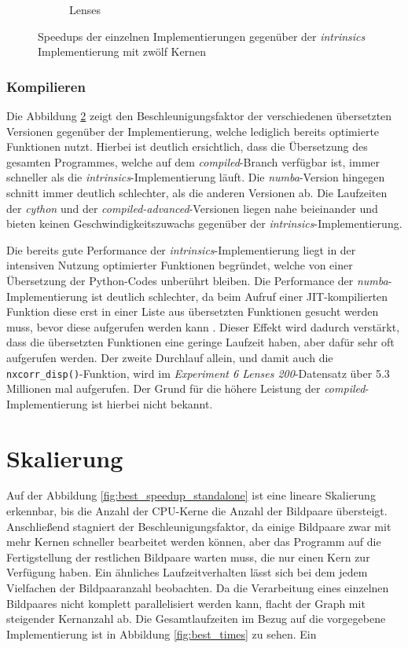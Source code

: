 \begin{center}
\begin{figure}[htbp]
\begin{subfigure}[b]{0.54\textwidth}
			\caption{Lenses}
			\label{fig:speedups_lenses}
		\end{subfigure}
		\caption{Speedups der einzelnen Implementierungen gegenüber der \textit{intrinsics} Implementierung mit zwölf Kernen}
		\label{fig:speedups}
	\end{figure}
\end{center}

\subsubsection{Kompilieren}

Die Abbildung \ref{fig:speedups} zeigt den Beschleunigungsfaktor der verschiedenen übersetzten Versionen gegenüber der Implementierung, welche lediglich bereits optimierte Funktionen nutzt. Hierbei ist deutlich ersichtlich, dass die Übersetzung des gesamten Programmes, welche auf dem \textit{compiled}-Branch verfügbar ist, immer schneller als die \textit{intrinsics}-Implementierung läuft. Die \textit{numba}-Version hingegen schnitt immer deutlich schlechter, als die anderen Versionen ab. Die Laufzeiten der \textit{cython} und der \textit{compiled-advanced}-Versionen liegen nahe beieinander und bieten keinen Geschwindigkeitszuwachs gegenüber der \textit{intrinsics}-Implementierung. 

Die bereits gute Performance der \textit{intrinsics}-Implementierung liegt in der intensiven Nutzung optimierter Funktionen begründet, welche von einer Übersetzung der Python-Codes unberührt bleiben. Die Performance der \textit{numba}-Implementierung ist deutlich schlechter, da beim Aufruf einer \gls{JIT}-kompilierten Funktion diese erst in einer Liste aus übersetzten Funktionen gesucht werden muss, bevor diese aufgerufen werden kann \cite{PKA17}. Dieser Effekt wird dadurch verstärkt, dass die übersetzten Funktionen eine geringe Laufzeit haben, aber dafür sehr oft aufgerufen werden. Der zweite Durchlauf allein, und damit auch die \texttt{nxcorr\_disp()}-Funktion, wird im \textit{Experiment 6 Lenses 200}-Datensatz über 5.3 Millionen mal aufgerufen. Der Grund für die höhere Leistung der \textit{compiled}-Implementierung ist hierbei nicht bekannt. 

\section{Skalierung}

Auf der Abbildung \ref{fig:best_speedup_standalone} ist eine lineare Skalierung erkennbar, bis die Anzahl der \gls{CPU}-Kerne die Anzahl der Bildpaare übersteigt. Anschließend stagniert der Beschleunigungsfaktor, da einige Bildpaare zwar mit mehr Kernen schneller bearbeitet werden können, aber das Programm auf die Fertigstellung der restlichen Bildpaare warten muss, die nur einen Kern zur Verfügung haben. Ein ähnliches Laufzeitverhalten lässt sich bei dem jedem Vielfachen der Bildpaaranzahl beobachten. Da die Verarbeitung eines einzelnen Bildpaares nicht komplett parallelisiert werden kann, flacht der Graph mit steigender Kernanzahl ab. Die Gesamtlaufzeiten im Bezug auf die vorgegebene Implementierung ist in Abbildung \ref{fig:best_times} zu sehen. Ein 

